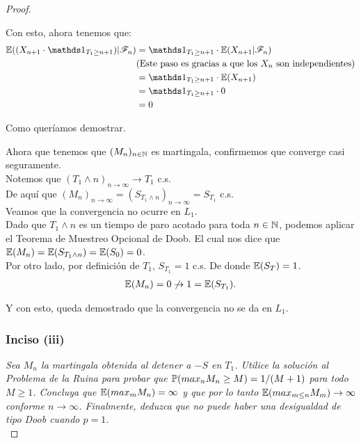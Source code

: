 \begin{proof}
\begin{itemize}
				Con esto, ahora tenemos que:
				\begin{align}
					\E((X_{n+1} \cdot \indic_{T_1 \geq n+1}) | \F_{n}) &= \indic_{T_1 \geq n+1} \cdot \E(X_{n+1} | \F_{n}) \\
					&\mbox{(Este paso es gracias a que los $X_n$ son independientes)} \\
					&=\indic_{T_1 \geq n+1} \cdot \E(X_{n+1} ) \\
					&=\indic_{T_1 \geq n+1} \cdot 0 \\
					&= 0
				\end{align}	
				
				Como queríamos demostrar.
		\end{itemize}
		
		Ahora que tenemos que $(M_n)_{n \in \mathbb{N}}$ es martingala, confirmemos que converge casi seguramente.\\
		
		Notemos que $(T_1 \wedge n)_{n \rightarrow \infty} \rightarrow T_1$ c.s.\\
		
		De aquí que $(M_n)_{n \rightarrow \infty} = (S_{T_1 \wedge n})_{n \rightarrow \infty} = S_{T_1}$ c.s. \\				
		
		Veamos que la convergencia no ocurre en $L_1$. \\
					
		Dado que $T_1 \wedge n$ es un tiempo de paro acotado para toda $n \in \mathbb{N}$,
		podemos aplicar el Teorema de Muestreo Opcional de 	Doob. 
		El cual nos dice que $\mathbb{E}(M_n) = \mathbb{E}(S_{T_1 \wedge n}) = \mathbb{E}(S_0) = 0$.\\
		
		Por otro lado, por definición de $T_1$, $S_{T_1} = 1$ c.s.	De donde $\mathbb{E}(S_T) = 1$.\\
		
		\begin{align}
			\mathbb{E}(M_n) = 0 \not\rightarrow 1 = \mathbb{E}(S_{T_1}).
		\end{align}			
		
		Y con esto, queda demostrado que la convergencia no se da en $L_1$.\\
		
	\subsubsection{Inciso (iii)}		
	\emph{
		Sea $M_n$ la martingala obtenida al detener a $-S$ en $T_1$. Utilice la solución al
		Problema de la Ruina para probar que $\mathbb{P}(max_n M_n \geq M) = 1/(M+1)$ para todo $M \geq 1$. Concluya que
		$\mathbb{E}(max_m M_n) = \infty$ y que por lo tanto $\mathbb{E}(max_{m\leq n} M_m) \rightarrow \infty$ conforme 
		$n \rightarrow \infty$. Finalmente, deduzca que no puede haber una desigualdad de tipo Doob cuando $p=1$.\\
	}	


\end{proof}
